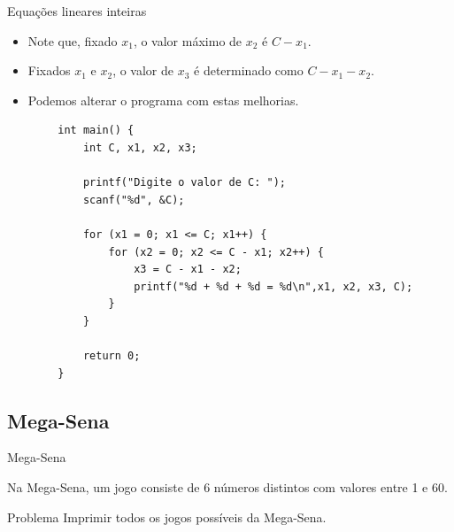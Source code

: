 \documentclass[handout]{beamer}
\begin{document}
\begin{frame}[fragile]{Equações lineares inteiras}

    \begin{itemize}
        \item Note que, fixado $x_1$, o valor máximo de $x_2$ é $C-x_1$.
        \item Fixados $x_1$ e $x_2$, o valor de $x_3$ é determinado como $C - x_1 - x_2$.
        \item Podemos alterar o programa com estas melhorias.
    \end{itemize}

    \begin{verbatim}
        int main() {
            int C, x1, x2, x3;

            printf("Digite o valor de C: ");
            scanf("%d", &C);

            for (x1 = 0; x1 <= C; x1++) {
                for (x2 = 0; x2 <= C - x1; x2++) {
                    x3 = C - x1 - x2;
                    printf("%d + %d + %d = %d\n",x1, x2, x3, C);
                }
            }

            return 0;
        }
    \end{verbatim}
\end{frame}

\subsection{Mega-Sena}%

\begin{frame}[fragile]{Mega-Sena}

    Na Mega-Sena, um jogo consiste de 6 números distintos com valores entre 1 e 60.

    \begin{block}{Problema}
        Imprimir todos os jogos possíveis da Mega-Sena.
    \end{block}
\end{frame}
\end{document}
